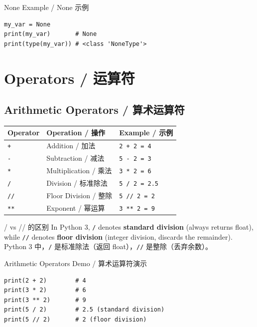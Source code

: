 \documentclass[11pt,a4paper]{article}
\begin{document}
\begin{examplebox}{None Example / None 示例}
\begin{lstlisting}
my_var = None
print(my_var)       # None
print(type(my_var)) # <class 'NoneType'>
\end{lstlisting}
\end{examplebox}

\section{Operators / 运算符}

\subsection{Arithmetic Operators / 算术运算符}

\begin{table}[h]
\centering
\renewcommand{\arraystretch}{1.5}
\begin{tabular}{@{}lll@{}}
\toprule
\textbf{Operator} & \textbf{Operation / 操作} & \textbf{Example / 示例} \\ \midrule
\texttt{+}  & Addition / 加法          & \texttt{2 + 2 = 4} \\
\texttt{-}  & Subtraction / 减法       & \texttt{5 - 2 = 3} \\
\texttt{*}  & Multiplication / 乘法    & \texttt{3 * 2 = 6} \\
\texttt{/}  & Division / 标准除法      & \texttt{5 / 2 = 2.5} \\
\texttt{//} & Floor Division / 整除    & \texttt{5 // 2 = 2} \\
\texttt{**} & Exponent / 幂运算        & \texttt{3 ** 2 = 9} \\ \bottomrule
\end{tabular}
\end{table}

\begin{warning}{/ vs // 的区别}
    In Python 3, \texttt{/} denotes \textbf{standard division} (always returns float), while \texttt{//} denotes \textbf{floor division} (integer division, discards the remainder). \\
    Python 3 中，\texttt{/} 是标准除法（返回 float），\texttt{//} 是整除（丢弃余数）。
\end{warning}

\begin{examplebox}{Arithmetic Operators Demo / 算术运算符演示}
\begin{lstlisting}
print(2 + 2)        # 4
print(3 * 2)        # 6
print(3 ** 2)       # 9
print(5 / 2)        # 2.5 (standard division)
print(5 // 2)       # 2 (floor division)
\end{lstlisting}
\end{examplebox}
\end{document}
